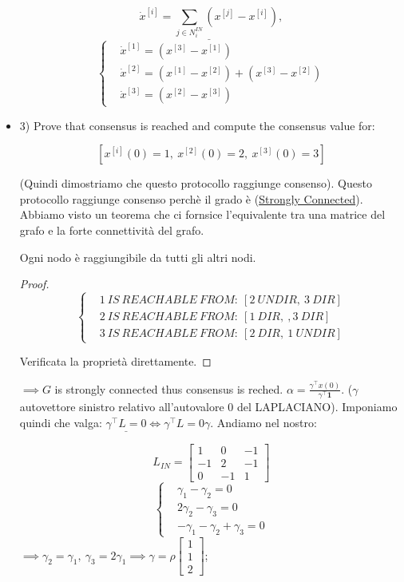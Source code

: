 \begin{itemize}
\[	
	\underline{\dot{x}^{[i]} = \sum_{j\in N_i^{IN}}{(x^{[j]}-x^{[i]})}},
\]
\[
	\left\{
	\begin{aligned}
	&\dot{x}^{[1]} = (x^{[3]} - x^{[1]})\\
	&\dot{x}^{[2]} = (x^{[1]} - x^{[2]}) + (x^{[3]} - x^{[2]})\\
	&\dot{x}^{[3]} = (x^{[2]} - x^{[3]})
	\end{aligned}
	\right.
\]

\item{3)} Prove that consensus is reached and compute the consensus value for:

\[
	[x^{[i]}(0) = 1,\ x^{[2]}(0) = 2,\ x^{[3]}(0) = 3]
\]

(Quindi dimostriamo che questo protocollo raggiunge consenso).
Questo protocollo raggiunge consenso perchè il grado è (\underline{Strongly Connected}). Abbiamo visto un teorema che ci fornsice l'equivalente tra una matrice del grafo e la forte connettività del grafo.

\begin{defn}
Ogni nodo è raggiungibile da tutti gli altri nodi.
\end{defn}

\begin{proof}
\[
	\left\{
	\begin{aligned}
	&1\ IS\ REACHABLE\ FROM:\ [2\ UNDIR,\ 3\ DIR]\\
	&2\ IS\ REACHABLE\ FROM:\ [1\ DIR,\ ,3\ DIR]\\
	&3\ IS\ REACHABLE\ FROM:\ [2\ DIR,\ 1\ UNDIR]
	\end{aligned}
	\right.
\]

Verificata la proprietà direttamente.
\end{proof}

$\implies G$ is strongly connected thus consensus is reched. $\alpha = \frac{\gamma^\top x(0)}{\gamma^\top\mathbf{1}}$. ($\gamma$ autovettore sinistro relativo all'autovalore 0 del LAPLACIANO). Imponiamo quindi che valga: $\underline{\gamma^\top L = 0} \iff \gamma^\top L = 0\gamma$. Andiamo nel nostro:

\[
	L_{IN} = \begin{bmatrix}1&0&-1\\-1&2&-1\\0&-1&1\end{bmatrix}
\]
\[
	\left\{
	\begin{aligned}
	&\gamma_1-\gamma_2 = 0\\
	&2\gamma_2 - \gamma_3 = 0\\
	&-\gamma_1 - \gamma_2 + \gamma_3 = 0
	\end{aligned}
	\right.
\]
$\implies \gamma_2=\gamma_1,\ \gamma_3=2\gamma_1 \implies \gamma = \rho\begin{bmatrix}1\\1\\2\end{bmatrix}$;


\end{itemize}
